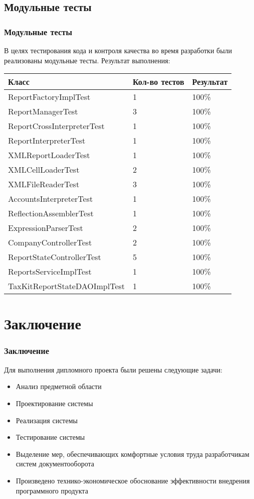 \documentclass[xcolor=pdftex, dvipsnames, table]{beamer}
\begin{document}
\subsection{Модульные тесты}
\begin{frame}
  \frametitle{Модульные тесты}
  В целях тестирования кода и контроля качества во время разработки были реализованы модульные тесты.
  Результат выполнения:
  \begin{center}
    \small {
      \begin{tabular}{|m{5cm}|m{3cm}|m{2cm}|} \hline
        \textbf{Класс} &
        \textbf{Кол-во тестов} &
        \textbf{Результат} \\ \hline
        ReportFactoryImplTest & 1 & 100\% \\ \hline
        ReportManagerTest & 3 & 100\% \\ \hline
        ReportCrossInterpreterTest & 1 & 100\% \\ \hline
        ReportInterpreterTest & 1 & 100\% \\ \hline
        XMLReportLoaderTest & 1 & 100\% \\ \hline
        XMLCellLoaderTest & 2 & 100\% \\ \hline
        XMLFileReaderTest & 3 & 100\% \\ \hline
        AccountsInterpreterTest & 1 & 100\% \\ \hline
        ReflectionAssemblerTest & 1 & 100\% \\ \hline
        ExpressionParserTest & 2 & 100\% \\ \hline
        CompanyControllerTest & 2 & 100\% \\ \hline
        ReportStateControllerTest & 5 & 100\%  \\ \hline
        ReportsServiceImplTest & 1 & 100\%  \\ \hline
        TaxKitReportStateDAOImplTest & 1 & 100\%  \\ \hline
      \end{tabular}
    }
  \end{center}
\end{frame}

\section{Заключение}
\begin{frame}
  \frametitle{Заключение}
  Для выполнения дипломного проекта были решены следующие задачи:
  \begin{itemize}
    \item Анализ предметной области
    \item Проектирование системы
    \item Реализация системы
    \item Тестирование системы
    \item Выделение мер, обеспечивающих комфортные условия труда разработчикам систем документооборота
    \item Произведено технико-экономическое обоснование эффективности внедрения программного продукта
  \end{itemize}
\end{frame}
\end{document}
